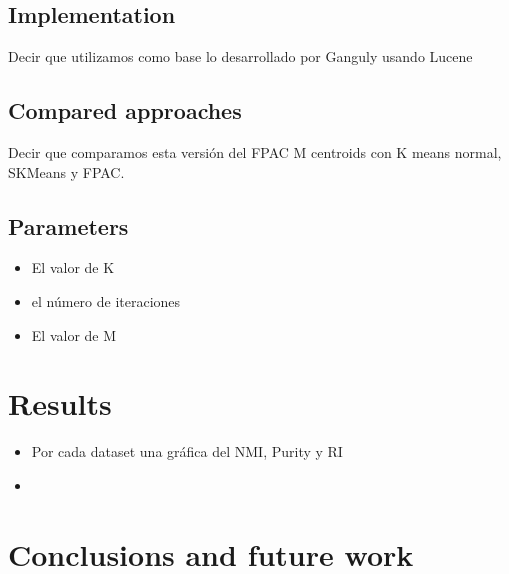 \documentclass[runningheads]{llncs}
\begin{document}
\subsection{Implementation}

Decir que utilizamos como base lo desarrollado por Ganguly usando Lucene
\subsection{Compared approaches}

Decir que comparamos esta versión del FPAC M centroids con K means normal, SKMeans y FPAC.

\subsection{Parameters}



\begin{itemize}
\item El valor de K
\item el número de iteraciones
\item El valor de M
\end{itemize}

\section{Results}

\begin{itemize}
\item Por cada dataset una gráfica del NMI, Purity y RI
\item 
\end{itemize}
\section{Conclusions and future work}

%
%
%


%
\end{document}
